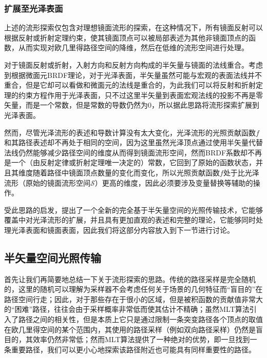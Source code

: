 \subsubsection{扩展至光泽表面}\label{sec:mlt-manifold-specular}
上述的流形探索仅包含对理想镜面流形的探索，在这种情况下，所有镜面反射可以根据反射或折射定理约束，使其镜面顶点可以被局部表述为其他非镜面顶点的函数，从而实现对欧几里得路径空间的降维，然后在低维的流形空间进行处理。

对于镜面反射或折射，入射方向和反射方向构成的半矢量与镜面的法线重合。考虑到根据微面元BRDF理论，对于光泽表面，半矢量虽然可能与宏观的表面法线并不重合，但是它却可以看做和微面元的法线是重合的，为此我们可以将反射和折射定理的约束方程作用于光泽表面，只不过这里半矢量到表面宏观法线的投影不再是零矢量，而是一个常数，但是常数的导数仍然为0，所以\cite{a:ManifoldExplorationAMarkovChainMonteCarloTechniqueforRenderingSceneswithDifficultSpecularTransport}据此思路将流形探索扩展到光泽表面。

然而，尽管光泽流形的表述和导数计算没有太大变化，光泽流形的光照贡献函数$f$和其路径表述却不再处于相同的空间，因为这里虽然光泽顶点通过使用半矢量代替法线仍然能够减少路径空间的维度从而得到镜面流形空间，然而BRDF系数却不再是一个（由反射定律或折射定理唯一决定的）常数，它回到了原始的函数状态，并且其维度随着路径中镜面顶点数量的变化而变化，所以光照贡献函数$f$处于比光泽流形（原始的镜面流形空间$\mathcal{S}$）更高的维度，因此必须要涉及变量替换等辅助的操作。

\cite{a:TheNaturalConstraintRepresentationofthePathSpaceforEfficientLightTransportSimulation}受此思路的启发，提出了一个全新的完全基于半矢量空间的光照传输技术，它能够覆盖\cite{a:ManifoldExplorationAMarkovChainMonteCarloTechniqueforRenderingSceneswithDifficultSpecularTransport}中对光泽流形的扩展，并且具有更加直观的表述和完整的理论，它能够同时处理光泽表面和镜面表面，因此我们将这部分内容放入到下一节进行讨论。





\subsection{半矢量空间光照传输}\label{sec:mlt-hslt}
首先让我们再简要地总结一下关于流形探索的思路。传统的路径采样是完全随机的，这里的随机可以理解为采样器不会考虑任何关于场景的几何特征而“盲目的”在路径空间行走；因此，对于那些存在于很小的区域，但是被积函数的贡献值非常大的“困难”路径，往往会由于采样概率非常低而使其估计不精确；虽然MLT算法引入了路径之间的相关性，但是本质上它只是通过限制一条突变路径各个顶点的取值在欧几里得空间的某个范围内，其使用的路径采样（例如双向路径采样）仍然是盲目的，其效率仍然非常低；然而MLT算法提供了一种绝对的优势，即一旦找到一条重要路径，我们可以更小心地探索该路径附近也可能具有同样重要性的路径。

